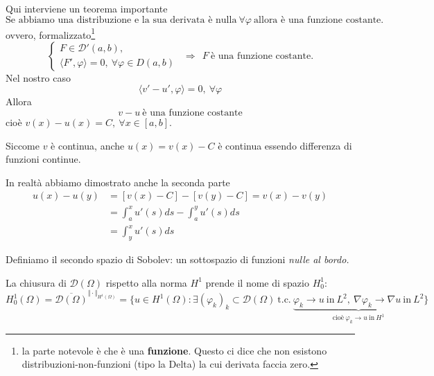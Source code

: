 \documentclass[10pt,a4paper,twoside,openright]{book}
\begin{document}
\begin{dimostrazione}
Qui interviene un teorema importante
\begin{equation*}
	\boxed{\text{Se abbiamo una distribuzione e la sua derivata è nulla} \ \forall \varphi \ \text{allora è una funzione costante.}}
\end{equation*}
ovvero, formalizzato\footnote{la parte notevole è che è una \textbf{funzione}. Questo ci dice che non esistono distribuzioni-non-funzioni (tipo la Delta) la cui derivata faccia zero.}
\begin{equation*}
	\boxed{\begin{cases}
		F\in \mathcal{D} '( a,b) ,\\
		\langle F',\varphi \rangle =0,\ \forall \varphi \in D( a,b)
		\end{cases} \ \ \Rightarrow \ \ F\ \text{è una funzione costante.}}
\end{equation*}
Nel nostro caso
\begin{equation*}
	\langle v'-u',\varphi \rangle =0,\ \forall \varphi 
\end{equation*}
Allora
\begin{equation*}
	v-u\ \text{è una funzione costante}
\end{equation*}
cioè $v( x) -u( x) =C,\ \forall x\in [ a,b]$.

Siccome $v$ è continua, anche $u( x) =v( x) -C$ è continua essendo differenza di funzioni continue.

In realtà abbiamo dimostrato anche la seconda parte
\begin{align*}
	u( x) -u( y) & =[ v( x) -C] -[ v( y) -C] =v( x) -v( y)          \\
	             & =\int ^{x}_{a} u'( s) ds-\int ^{y}_{a} u'( s) ds \\
	             & =\int ^{x}_{y} u'( s) ds                         
\end{align*}
\end{dimostrazione}
Definiamo il secondo spazio di Sobolev: un sottospazio di funzioni \textit{nulle al bordo.}
\begin{definition}
	La chiusura di $\mathcal{D}( \Omega )$ rispetto alla norma $H^{1}$ prende il nome di spazio $H^{1}_{0}$:
	\begin{equation*}
		H^{1}_{0}( \Omega )  =\overline{\mathcal{D}( \Omega )}^{\Vert \cdotp \Vert _{H^{1}( \Omega )}}                                                                                                                                                                                                                             
		                     =\bigg\{u\in H^{1}( \Omega ) :\exists ( \varphi _{k})_{k} \subset \mathcal{D}( \Omega ) \ \text{t.c.} \ \underbrace{\varphi _{k}\rightarrow u\ \text{in} \ L^{2} ,\ \nabla \varphi _{k}\rightarrow \nabla u\ \text{in} \ L^{2}}_{\text{cioè} \ \varphi _{k}\rightarrow u\ \text{in} \ H^{1}}\bigg\} 
	\end{equation*}
\end{definition}
\end{document}
